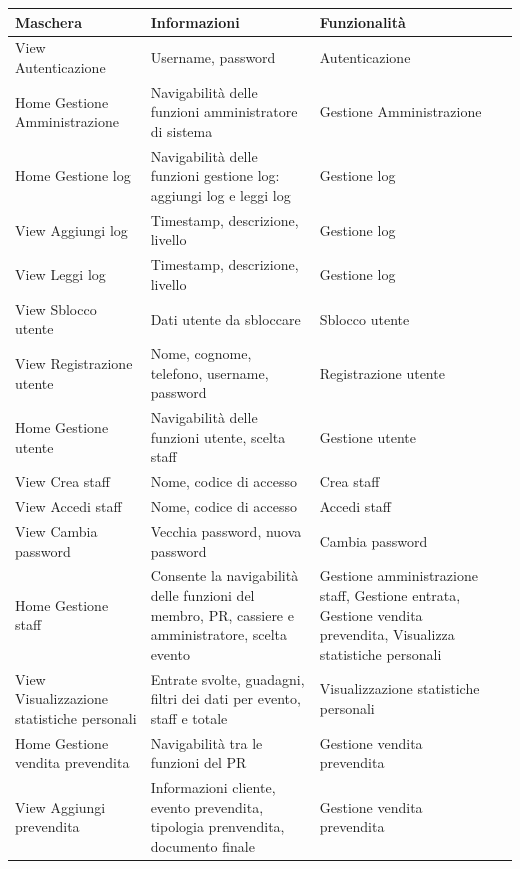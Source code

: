 \documentclass[a4paper]{article}
\begin{document}
\begin{center}
    \begin{tabularx}{1\textwidth}{|X|X|X|X|}
    \hline
    \textbf{Maschera} & \textbf{Informazioni} & \textbf{Funzionalità}\\
    \hline
    \hline
    View Autenticazione & Username, password & Autenticazione\\
    \hline
    Home Gestione Amministrazione & Navigabilità delle funzioni amministratore di sistema & Gestione Amministrazione\\
    \hline
    Home Gestione log & Navigabilità delle funzioni gestione log: aggiungi log e leggi log & Gestione log\\
    \hline
    View Aggiungi log & Timestamp, descrizione, livello & Gestione log\\
    \hline
    View Leggi log & Timestamp, descrizione, livello & Gestione log\\
    \hline
    View Sblocco utente & Dati utente da sbloccare & Sblocco utente \\
    \hline
    View Registrazione utente & Nome, cognome, telefono, username, password & Registrazione utente\\
    \hline
    Home Gestione utente & Navigabilità delle funzioni utente, scelta staff & Gestione utente\\
    \hline
    View Crea staff & Nome, codice di accesso & Crea staff\\
    \hline
    View Accedi staff & Nome, codice di accesso & Accedi staff\\
    \hline
    View Cambia password & Vecchia password, nuova password & Cambia password\\
    \hline
    Home Gestione staff & Consente la navigabilità delle funzioni del membro, PR, cassiere e amministratore, scelta evento & Gestione amministrazione staff, Gestione entrata, Gestione vendita prevendita, Visualizza statistiche personali\\
    \hline
    View Visualizzazione statistiche personali & Entrate svolte, guadagni, filtri dei dati per evento, staff e totale & Visualizzazione statistiche personali\\
    \hline
    Home Gestione vendita prevendita & Navigabilità tra le funzioni del PR & Gestione vendita prevendita\\
    \hline
    View Aggiungi prevendita & Informazioni cliente, evento prevendita, tipologia prenvendita, documento finale & Gestione vendita prevendita\\
    \hline

\end{tabularx}
\end{center}
\end{document}
